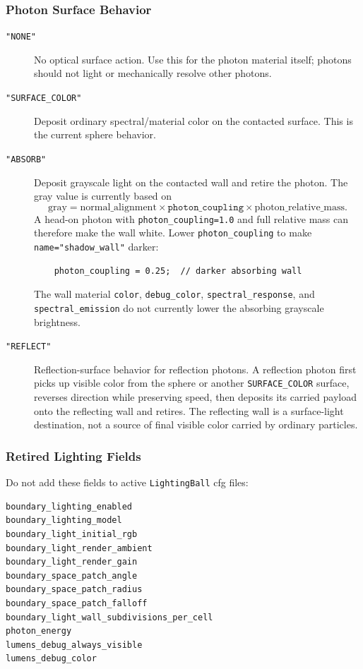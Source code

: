 \subsubsection{Photon Surface Behavior}

\begin{description}
    \item[\texttt{"NONE"}] No optical surface action.  Use this for the photon
    material itself; photons should not light or mechanically resolve other
    photons.
    \item[\texttt{"SURFACE\_COLOR"}] Deposit ordinary spectral/material color
    on the contacted surface.  This is the current sphere behavior.
    \item[\texttt{"ABSORB"}] Deposit grayscale light on the contacted wall and
    retire the photon.  The gray value is currently based on
    \[
        \mathrm{gray}
        = \mathrm{normal\_alignment}
          \times \texttt{photon\_coupling}
          \times \mathrm{photon\_relative\_mass}.
    \]
    A head-on photon with \texttt{photon\_coupling=1.0} and full relative mass
    can therefore make the wall white.  Lower \texttt{photon\_coupling} to
    make \texttt{name="shadow\_wall"} darker:
    \begin{verbatim}
    photon_coupling = 0.25;  // darker absorbing wall
    \end{verbatim}
    The wall material \texttt{color}, \texttt{debug\_color},
    \texttt{spectral\_response}, and \texttt{spectral\_emission} do not
    currently lower the absorbing grayscale brightness.
    \item[\texttt{"REFLECT"}] Reflection-surface behavior for reflection
    photons.  A reflection photon first picks up visible color from the
    sphere or another \texttt{SURFACE\_COLOR} surface, reverses direction
    while preserving speed, then deposits its carried payload onto the
    reflecting wall and retires.  The reflecting wall is a surface-light
    destination, not a source of final visible color carried by ordinary
    particles.
\end{description}

\subsubsection{Retired Lighting Fields}

Do not add these fields to active \texttt{LightingBall} cfg files:
\begin{verbatim}
boundary_lighting_enabled
boundary_lighting_model
boundary_light_initial_rgb
boundary_light_render_ambient
boundary_light_render_gain
boundary_space_patch_angle
boundary_space_patch_radius
boundary_space_patch_falloff
boundary_light_wall_subdivisions_per_cell
photon_energy
lumens_debug_always_visible
lumens_debug_color
\end{verbatim}


